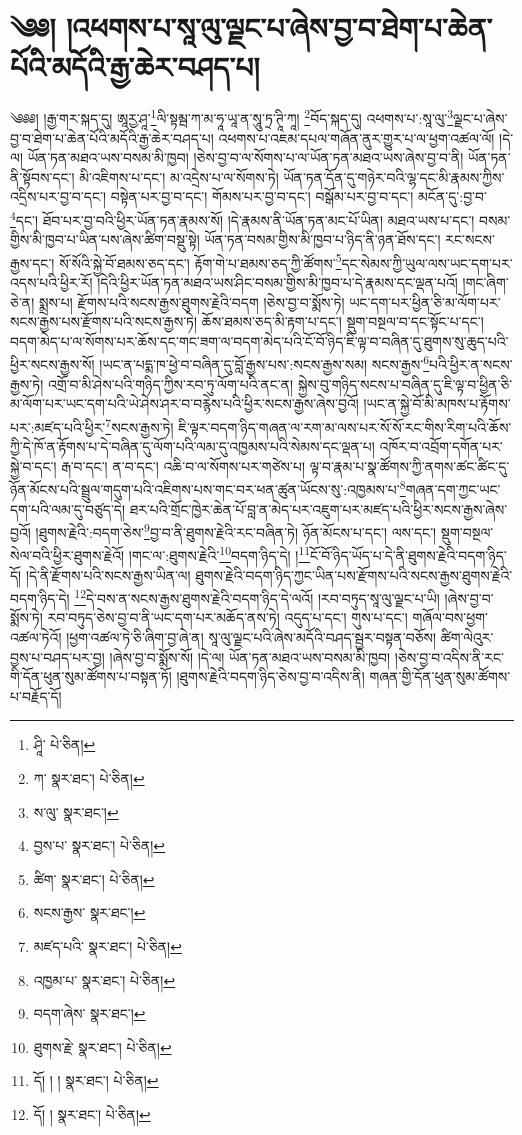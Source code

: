 \setcounter{footnote}{0} 
\chapter{༄༅། །འཕགས་པ་སཱ་ལུ་ལྗང་པ་ཞེས་བྱ་བ་ཐེག་པ་ཆེན་པོའི་མདོའི་རྒྱ་ཆེར་བཤད་པ།}༄༅༅། །རྒྱ་གར་སྐད་དུ། ཨཱརྱ་ཤཱ་\footnote{ཤཱི་  པེ་ཅིན། }ལི་སྟམྦ་ཀ་མ་ཧཱ་ཡཱ་ན་སཱུ་ཏྲ་ཊཱི་ཀཱ། \footnote{ཀ་  སྣར་ཐང་།  པེ་ཅིན། }བོད་སྐད་དུ། འཕགས་པ་:སཱ་ལུ་\footnote{ས་ལུ་  སྣར་ཐང་། }ལྗང་པ་ཞེས་བྱ་བ་ཐེག་པ་ཆེན་པོའི་མདོའི་རྒྱ་ཆེར་བཤད་པ། འཕགས་པ་འཇམ་དཔལ་གཞོན་ནུར་གྱུར་པ་ལ་ཕྱག་འཚལ་ལོ། །དེ་ལ། ཡོན་ཏན་མཐའ་ཡས་བསམ་མི་ཁྱབ། །ཅེས་བྱ་བ་ལ་སོགས་པ་ལ་ཡོན་ཏན་མཐའ་ཡས་ཞེས་བྱ་བ་ནི། ཡོན་ཏན་ནི་སྟོབས་དང་། མི་འཇིགས་པ་དང་། མ་འདྲེས་པ་ལ་སོགས་ཏེ། ཡོན་ཏན་དོན་དུ་གཉེར་བའི་ལྷ་དང་མི་རྣམས་ཀྱིས་འདྲིས་པར་བྱ་བ་དང་། བསྟེན་པར་བྱ་བ་དང་། གོམས་པར་བྱ་བ་དང་། བསྒོམ་པར་བྱ་བ་དང་། མངོན་དུ་:བྱ་བ་\footnote{བྱས་པ་  སྣར་ཐང་།  པེ་ཅིན། }དང་། ཐོབ་པར་བྱ་བའི་ཕྱིར་ཡོན་ཏན་རྣམས་སོ། །དེ་རྣམས་ནི་ཡོན་ཏན་མང་པོ་ཡིན། མཐའ་ཡས་པ་དང་། བསམ་གྱིས་མི་ཁྱབ་པ་ཡིན་པས་ཞེས་ཚིག་བསྡུ་སྟེ། ཡོན་ཏན་བསམ་གྱིས་མི་ཁྱབ་པ་ཉིད་ནི་ཉན་ཐོས་དང་། རང་སངས་རྒྱས་དང་། སོ་སོའི་སྐྱེ་བོ་ཐམས་ཅད་དང་། རྟོག་གེ་པ་ཐམས་ཅད་ཀྱི་ཚོགས་\footnote{ཚིག་  སྣར་ཐང་།  པེ་ཅིན། }དང་སེམས་ཀྱི་ཡུལ་ལས་ཡང་དག་པར་འདས་པའི་ཕྱིར་རོ། །དེའི་ཕྱིར་ཡོན་ཏན་མཐའ་ཡས་ཤིང་བསམ་གྱིས་མི་ཁྱབ་པ་དེ་རྣམས་དང་ལྡན་པའོ། །གང་ཞིག་ཅེ་ན། སྨྲས་པ། རྫོགས་པའི་སངས་རྒྱས་ཐུགས་རྗེའི་བདག །ཅེས་བྱ་བ་སྨོས་ཏེ། ཡང་དག་པར་ཕྱིན་ཅི་མ་ལོག་པར་སངས་རྒྱས་པས་རྫོགས་པའི་སངས་རྒྱས་ཏེ། ཆོས་ཐམས་ཅད་མི་རྟག་པ་དང་། སྡུག་བསྔལ་བ་དང་སྟོང་པ་དང་། བདག་མེད་པ་ལ་སོགས་པར་ཆོས་དང་གང་ཟག་ལ་བདག་མེད་པའི་ངོ་བོ་ཉིད་ཇི་ལྟ་བ་བཞིན་དུ་ཐུགས་སུ་ཆུད་པའི་ཕྱིར་སངས་རྒྱས་སོ། །ཡང་ན་པདྨ་ཁ་ཕྱེ་བ་བཞིན་དུ་བློ་རྒྱས་པས་:སངས་རྒྱས་སམ། སངས་རྒྱས་\footnote{སངས་རྒྱས་  སྣར་ཐང་། }པའི་ཕྱིར་ན་སངས་རྒྱས་ཏེ། འགྲོ་བ་མི་ཤེས་པའི་གཉིད་ཀྱིས་རབ་ཏུ་ལོག་པའི་ནང་ན། སྐྱེས་བུ་གཉིད་སངས་པ་བཞིན་དུ་ཇི་ལྟ་བ་ཕྱིན་ཅི་མ་ལོག་པར་ཡང་དག་པའི་ཡེ་ཤེས་ཤར་བ་བརྙེས་པའི་ཕྱིར་སངས་རྒྱས་ཞེས་བྱའོ། །ཡང་ན་སྐྱེ་བོ་མི་མཁས་པ་རྟོགས་པར་:མཛད་པའི་ཕྱིར་\footnote{མཛད་པའི་  སྣར་ཐང་།  པེ་ཅིན། }སངས་རྒྱས་ཏེ། ཇི་ལྟར་བདག་ཉིད་གཞན་ལ་རག་མ་ལས་པར་སོ་སོ་རང་གིས་རིག་པའི་ཆོས་ཀྱི་དེ་ཁོ་ན་རྟོགས་པ་དེ་བཞིན་དུ་ལོག་པའི་ལམ་དུ་འཁྱམས་པའི་སེམས་དང་ལྡན་པ། འཁོར་བ་འབྲོག་དགོན་པར་སྐྱེ་བ་དང་། རྒ་བ་དང་། ན་བ་དང་། འཆི་བ་ལ་སོགས་པར་གཙེས་པ། ལྟ་བ་རྣམ་པ་སྣ་ཚོགས་ཀྱི་ནགས་ཚང་ཚིང་དུ་ཉོན་མོངས་པའི་སྦྲུལ་གདུག་པའི་འཇིགས་པས་གང་བར་ཕན་ཚུན་ཡོངས་སུ་:འཁྱམས་པ་\footnote{འཁྱམ་པ་  སྣར་ཐང་།  པེ་ཅིན། }གཞན་དག་ཀྱང་ཡང་དག་པའི་ལམ་དུ་བཙུད་དེ། ཐར་པའི་གྲོང་ཁྱེར་ཆེན་པོ་བླ་ན་མེད་པར་འཇུག་པར་མཛད་པའི་ཕྱིར་སངས་རྒྱས་ཞེས་བྱའོ། །ཐུགས་རྗེའི་:བདག་ཅེས་\footnote{བདག་ཞེས་  སྣར་ཐང་། }བྱ་བ་ནི་ཐུགས་རྗེའི་རང་བཞིན་ཏེ། ཉོན་མོངས་པ་དང་། ལས་དང་། སྡུག་བསྔལ་སེལ་བའི་ཕྱིར་ཐུགས་རྗེའོ། །གང་ལ་:ཐུགས་རྗེའི་\footnote{ཐུགས་རྗེ་  སྣར་ཐང་།  པེ་ཅིན། }བདག་ཉིད་དེ། །\footnote{དོ། ། །  སྣར་ཐང་།  པེ་ཅིན། }ངོ་བོ་ཉིད་ཡོད་པ་དེ་ནི་ཐུགས་རྗེའི་བདག་ཉིད་དོ། །དེ་ནི་རྫོགས་པའི་སངས་རྒྱས་ཡིན་ལ། ཐུགས་རྗེའི་བདག་ཉིད་ཀྱང་ཡིན་པས་རྫོགས་པའི་སངས་རྒྱས་ཐུགས་རྗེའི་བདག་ཉིད་དེ། \footnote{དོ། །   སྣར་ཐང་།  པེ་ཅིན། }དེ་བས་ན་སངས་རྒྱས་ཐུགས་རྗེའི་བདག་ཉིད་དེ་ལའོ། །རབ་བཏུད་སཱ་ལུ་ལྗང་པ་ཡི། །ཞེས་བྱ་བ་སྨོས་ཏེ། རབ་བཏུད་ཅེས་བྱ་བ་ནི་ཡང་དག་པར་མཆོད་ནས་ཏེ། འདུད་པ་དང་། གུས་པ་དང་། གཞོལ་བས་ཕྱག་འཚལ་ཏེའོ། །ཕྱག་འཚལ་ཏེ་ཅི་ཞིག་བྱ་ཞེ་ན། སཱ་ལུ་ལྗང་པའི་ཞེས་མདོའི་བཤད་སྦྱར་བསྟན་བཅོས། ཚིག་ལེའུར་བྱས་པ་བཤད་པར་བྱ། །ཞེས་བྱ་བ་སྨོས་སོ། །དེ་ལ། ཡོན་ཏན་མཐའ་ཡས་བསམ་མི་ཁྱབ། །ཅེས་བྱ་བ་འདིས་ནི་རང་གི་དོན་ཕུན་སུམ་ཚོགས་པ་བསྟན་ཏོ། །ཐུགས་རྗེའི་བདག་ཉིད་ཅེས་བྱ་བ་འདིས་ནི། གཞན་གྱི་དོན་ཕུན་སུམ་ཚོགས་པ་བརྗོད་དོ། 